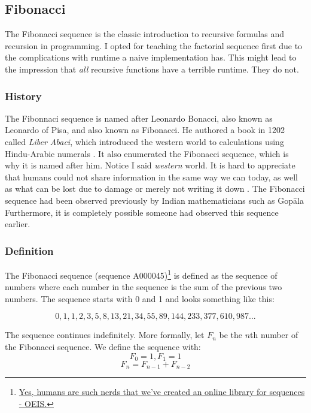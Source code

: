 \subsection{Fibonacci}

The Fibonacci sequence is the classic introduction to recursive formulas and recursion in programming.  I opted for teaching the factorial sequence first due to the complications with runtime a naive implementation has.  This might lead to the impression that \textit{all} recursive functions have a terrible runtime.  They do not.  





\subsubsection{History}
The Fibonnaci sequence is named after Leonardo Bonacci, also known as Leonardo of Pisa, and also known as Fibonacci.  He authored a book in 1202 called \textit{Liber Abaci}, which introduced the western world to calculations using Hindu-Arabic numerals .  It also enumerated the Fibonacci sequence, which is why it is named after him\cite{Bonacci1202,sigler2002fibonacci}.   Notice I said \textit{western} world.  It is hard to appreciate that humans could not share information in the same way we can today, as well as what can be lost due to damage or merely not writing it down .   The Fibonacci sequence had been observed previously by Indian mathematicians such as Gop\={a}la  \cite{singh1985fib}
Furthermore, it is completely possible someone had observed this sequence earlier.

\subsubsection{Definition}
The Fibonacci sequence  (sequence A000045)\footnote{\href{https://oeis.org/}{Yes, humans are such nerds that we've created an online library for sequences - OEIS.}} is defined as the sequence of numbers where each number in the sequence is the sum of the previous two numbers.  The sequence starts with 0 and 1  and looks something like this:

$$0, 1, 1, 2, 3, 5, 8, 13, 21, 34, 55, 89, 144, 233, 377, 610, 987...$$

The sequence continues indefinitely. More formally, let $F_n$ be the $n$th number of the Fibonacci sequence. We define the sequence with:
$$ F_{0} = 1, F_{1} = 1$$
$$ F_n = F_{n-1} + F_{n-2}$$


